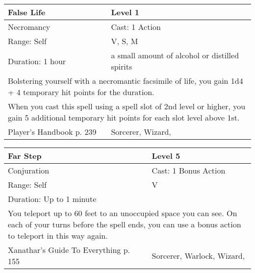 \documentclass[11pt]{report}
\begin{document}
\begin{table}[H]
	\begin{tabular}{||p{6cm}|p{6cm}||}
		\hline\hline
		\bf{False Life} & Level 1\\ \hline
		Necromancy & Cast: 1 Action\\ \hline
		Range: Self & V, S, M\\ \hline
		Duration: 1 hour & a small amount of alcohol or distilled spirits\\ \hline
		\multicolumn{2}{||p{12cm}||}{Bolstering yourself with a necromantic facsimile of life, you gain 1d4 + 4 temporary hit points for the duration.}\\ \hline
		\multicolumn{2}{||p{12cm}||}{When you cast this spell using a spell slot of 2nd level or higher, you gain 5 additional temporary hit points for each slot level above 1st.}\\ \hline
Player's Handbook p. 239 & Sorcerer, Wizard, \\ \hline\hline
	\end{tabular}
\end{table}

\begin{table}[H]
	\begin{tabular}{||p{6cm}|p{6cm}||}
		\hline\hline
		\bf{Far Step} & Level 5\\ \hline
		Conjuration & Cast: 1 Bonus Action\\ \hline
		Range: Self & V\\ \hline
		Duration: Up to 1 minute & \\ \hline
		\multicolumn{2}{||p{12cm}||}{You teleport up to 60 feet to an unoccupied space you can see. On each of your turns before the spell ends, you can use a bonus action to teleport in this way again.}\\ \hline
Xanathar's Guide To Everything p. 155 & Sorcerer, Warlock, Wizard, \\ \hline\hline
	\end{tabular}
\end{table}
\end{document}
